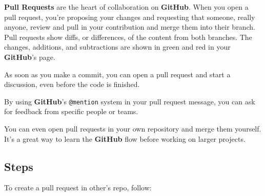 \documentclass[12pt,a4paper,titlepage,brazil]{article}
\begin{document}
{{\bf Pull Requests} are the heart of collaboration on {\bf GitHub}. When you open a pull request, you're
proposing your changes and requesting that someone, really anyone, review and pull in your contribution
and merge them into their branch. Pull requests show diffs, or differences, of the content from both
branches. The changes, additions, and subtractions are shown in {\color{green}green} and
{\color{red}red} in your {\bf GitHub}'s page.

As soon as you make a commit, you can open a pull request and start a discussion, even before the code is finished.

By using {\bf GitHub}’s \texttt{@mention} system in your pull request message, you can ask for feedback from specific people or teams.

You can even open pull requests in your own repository and merge them yourself. It's a great way to learn the {\bf GitHub} flow before working on larger projects.

\subsection{Steps}

To create a pull request in other's repo, follow:

}
\end{document}
